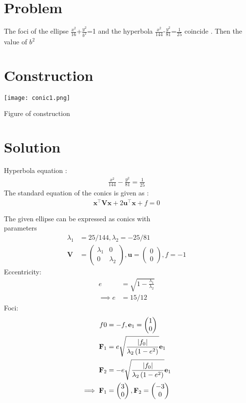 \documentclass[10pt, a4paper]{article}
\title{\mytitle}
\author{\myauthor\hspace{1em}\\\contact\\FWC22032\hspace{6.5em}IITH\hspace{0.5em}\mymodule\hspace{6em}Assignment}
\providecommand{\brak}[1]{\ensuremath{\left(#1\right)}}
\newcommand{\myvec}[1]{\ensuremath{\begin{pmatrix}#1\end{pmatrix}}}
\let\vec\mathbf
\begin{document}
	\maketitle
	\tableofcontents
   \section{Problem}
The foci of the ellipse $\frac{x^2}{16}$+$\frac{y^2}{b^2}$=1 and the hyperbola $\frac{x^2}{144}$-$\frac{y^2}{81}$=$\frac{1}{25}$ coincide . Then 
the value of   $b^2$
   
\section{Construction}
  \texttt{[image: conic1.png]}
  	\begin{center}
  Figure of construction
  	\end{center}
  \section{Solution}

Hyperbola equation : \begin{align}
\frac{x^2}{144}-\frac{y^2}{81}=\frac{1}{25}
  \end{align}
The standard equation of the conics is given as :
\begin{align}
\vec{x}^{\top}\vec{V}\vec{x}+2\vec{u}^{\top}\vec{x}+f=0
\end{align}

The given ellipse can be expressed as conics with \\parameters
\begin{align}
	\lambda_1&=25/144,\lambda_2=-25/81 \\ \vec{V} &= \myvec{	\lambda_1& 0 \\
			          0 & \lambda_2}  
		    , \vec{u} = \myvec{0 \\0}, f = -1
	\end{align}
	Eccentricity:
	\begin{align}
	 e&=\sqrt{1-\frac{\lambda_1}{\lambda_2}}\\
	 \implies e&=15/12
	 \end{align}
	 Foci:
	 \begin{align}
	 f0&=-f,\vec{e}_1 = \myvec{1 \\0}\\
	 	 \vec{F}_1&=  e\sqrt{\frac{\abs{f_0}}{\lambda_2\brak{1-e^2}}}\vec{e}_1\\
	 	 \vec{F}_2&= - e\sqrt{\frac{\abs{f_0}}{\lambda_2\brak{1-e^2}}}\vec{e}_1\\
	 \implies \vec{F}_1&=\myvec{3\\0},\vec{F}_2=\myvec{-3\\0}
	 \end{align}
	 
\end{document}
